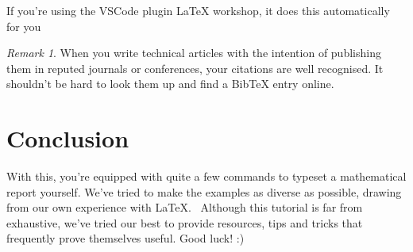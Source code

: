 \documentclass[12pt, letterpaper]{article}
\theoremstyle{remark}
\newtheorem*{remark}{Remark}
\begin{document}
If you're using the VSCode plugin \LaTeX{} workshop, it does this automatically for you

\begin{remark}
When you write technical articles with the intention of publishing them in reputed journals or conferences, your citations are well recognised. It shouldn't be hard to look them up and find a BibTeX entry online.
\end{remark}

\section{Conclusion}
With this, you're equipped with quite a few commands to typeset a mathematical report yourself. We've tried to make the examples as diverse as possible, drawing from our own experience with \LaTeX.~ Although this tutorial is far from exhaustive, we've tried our best to provide resources, tips and tricks that frequently prove themselves useful. Good luck! :)

\newpage



\end{document}
